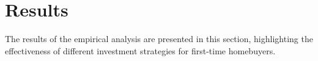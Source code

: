 \section{Results}
The results of the empirical analysis are presented in this section, highlighting the effectiveness of different investment strategies for first-time homebuyers.
